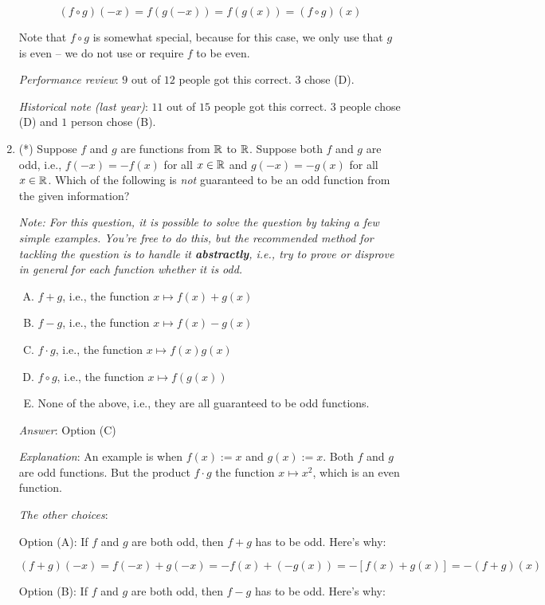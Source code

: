 \documentclass[10pt]{amsart}
\begin{document}
\begin{enumerate}
  $$(f \circ g)(-x) = f(g(-x)) = f(g(x)) = (f \circ g)(x)$$

  Note that $f \circ g$ is somewhat special, because for this case, we
  only use that $g$ is even -- we do not use or require $f$ to be even.

  {\em Performance review}: $9$ out of $12$ people got this
  correct. $3$ chose (D).

  {\em Historical note (last year)}: $11$ out of $15$ people got this
  correct. $3$ people chose (D) and $1$ person chose (B).

\item (*) Suppose $f$ and $g$ are functions from $\mathbb{R}$ to $\mathbb{R}$. Suppose
  both $f$ and $g$ are odd, i.e., $f(-x) = -f(x)$ for all $x \in \mathbb{R}$
  and $g(-x) = -g(x)$ for all $x \in \mathbb{R}$. Which of the following is
  {\em not} guaranteed to be an odd function from the given information?

  {\em Note: For this question, it is possible to solve the question
  by taking a few simple examples. You're free to do this, but the
  recommended method for tackling the question is to handle it {\bf
  abstractly}, i.e., try to prove or disprove in general for each
  function whether it is odd.}

  \begin{enumerate}[(A)]
  \item $f + g$, i.e., the function $x \mapsto f(x) + g(x)$
  \item $f - g$, i.e., the function $x \mapsto f(x) - g(x)$
  \item $f \cdot g$, i.e., the function $x \mapsto f(x)g(x)$
  \item $f \circ g$, i.e., the function $x \mapsto f(g(x))$
  \item None of the above, i.e., they are all guaranteed to be odd functions.
  \end{enumerate}

  {\em Answer}: Option (C)

  {\em Explanation}: An example is when $f(x) := x$ and $g(x) :=
  x$. Both $f$ and $g$ are odd functions. But the product $f \cdot g$
  the function $x \mapsto x^2$, which is an even function.
  
  {\em The other choices}:

  Option (A): If $f$ and $g$ are both odd, then $f + g$ has to be
  odd. Here's why:

  $$(f + g)(-x) = f(-x) + g(-x) = -f(x) + (-g(x)) = -[f(x) + g(x)] = -(f + g)(x)$$

  Option (B): If $f$ and $g$ are both odd, then $f - g$ has to be
  odd. Here's why:


\end{enumerate}
\end{document}

